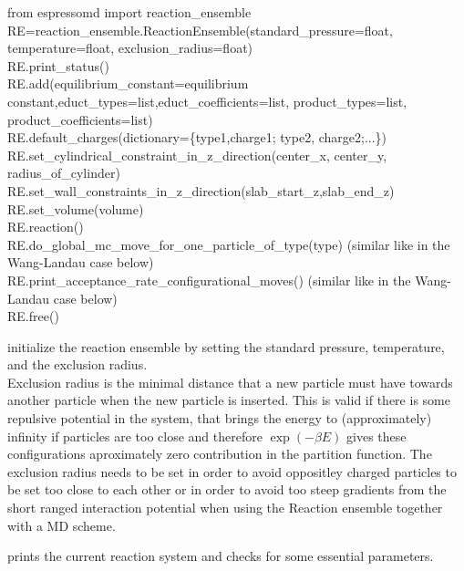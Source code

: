   \begin{pysyntax}
  	from espressomd import reaction_ensemble \\
  	  RE=reaction_ensemble.ReactionEnsemble(standard_pressure=float, temperature=float, exclusion_radius=float) \\
  	  RE.print_status() \\
  	  RE.add(equilibrium_constant=equilibrium constant,educt_types=list,educt_coefficients=list, product_types=list, product_coefficients=list) \\
  	  RE.default_charges(dictionary=\{type1,charge1; type2, charge2;...\}) \\
  	  RE.set_cylindrical_constraint_in_z_direction(center_x, center_y, radius_of_cylinder) \\
  	  RE.set_wall_constraints_in_z_direction(slab_start_z,slab_end_z) \\
	  RE.set_volume(volume) \\
	  RE.reaction() \\
	  RE.do_global_mc_move_for_one_particle_of_type(type) (similar like in the Wang-Landau case below) \\
	 RE.print_acceptance_rate_configurational_moves() (similar like in the Wang-Landau case below) \\
	 RE.free() 
	\begin{features}
	\end{features}
\end{pysyntax}
  
 initialize the reaction ensemble by setting the standard pressure, temperature, and the exclusion radius.\\
Exclusion radius is the minimal distance that a new
particle must have towards another particle when the new particle is inserted.
This is valid if there is some repulsive potential in the system, that brings
the energy to (approximately) infinity if particles are too close and therefore
$\exp(-\beta E)$ gives these configurations aproximately zero contribution in
the partition function. The exclusion radius needs to be set in order to avoid oppositley charged particles to be set too close to each other or in order to avoid too steep gradients from the short ranged interaction potential when using the Reaction ensemble together with a MD scheme.

 prints the current reaction system and checks for some essential parameters.

